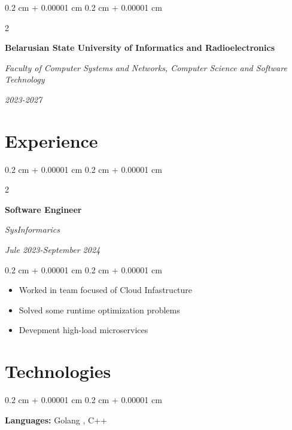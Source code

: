\documentclass[10pt, letterpaper]{article}
\newenvironment{highlights}{
    \begin{itemize}[
        topsep=0.10 cm,
        parsep=0.10 cm,
        partopsep=0pt,
        itemsep=0pt,
        leftmargin=0.4 cm + 10pt
    ]
}{
    \end{itemize}
}
\newenvironment{onecolentry}{
    \begin{adjustwidth}{
        0.2 cm + 0.00001 cm
    }{
        0.2 cm + 0.00001 cm
    }
}{
    \end{adjustwidth}
}
\newenvironment{twocolentry}[2][]{
    \onecolentry
    \def\secondColumn{#2}
    \setcolumnwidth{\fill, 4.5 cm}
    \begin{paracol}{2}
}{
    \switchcolumn \raggedleft \secondColumn
    \end{paracol}
    \endonecolentry
}
\begin{document}
        \begin{twocolentry}{


        \textit{2023-2027}}
            \textbf{Belarusian State University of Informatics and Radioelectronics}

            \textit{Faculty of Computer Systems and Networks, Computer Science and Software Technology}
        \end{twocolentry}






    \section{Experience}




        \begin{twocolentry}{


        \textit{Jule 2023-September 2024}}
            \textbf{Software Engineer}

            \textit{SysInformarics}
        \end{twocolentry}

        \vspace{0.10 cm}
        \begin{onecolentry}
            \begin{highlights}
                \item Worked in team  focused of Cloud Infastructure
                \item Solved some runtime optimization problems
                \item Devepment high-load microservices
            \end{highlights}
        \end{onecolentry}









    \section{Technologies}




        \begin{onecolentry}
            \textbf{Languages:} Golang , C++
        \end{onecolentry}

        \vspace{0.2 cm}
\end{document}
